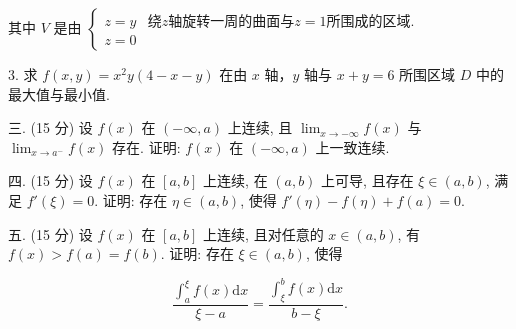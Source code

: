 \documentclass{examcollection}
\renewcommand{\displayformula}[1]{\[#1\]}
\begin{document}
{\begin{minipage}{\textwidth}
其中 $V$ 是由 $\left\{ \begin{array}{ll}z = y & \text{绕} z\text{轴旋转一周的曲面与} z = 1\text{所围成的区域}.\\ z = 0 & \end{array} \right.$\par
3. 求 $f(x, y) = x^2 y (4 - x - y)$ 在由 $x$ 轴，$y$ 轴与 $x + y = 6$ 所围区域 $D$ 中的最大值与最小值.\par
三. (15 分) 设 $f(x)$ 在 $(- \infty, a)$ 上连续, 且 $\lim_{x \to -\infty} f(x)$ 与 $\lim_{x \to a^{-}} f(x)$ 存在. 证明: $f(x)$ 在 $(- \infty, a)$ 上一致连续.\par
四. (15 分) 设 $f(x)$ 在 $[a, b]$ 上连续, 在 $(a, b)$ 上可导, 且存在 $\xi \in (a, b)$, 满足 $f'(\xi) = 0$. 证明: 存在 $\eta \in (a, b)$, 使得 $f'(\eta) - f(\eta) + f(a) = 0$.\par
五. (15 分) 设 $f(x)$ 在 $[a, b]$ 上连续, 且对任意的 $x \in (a, b)$, 有 $f(x) > f(a) = f(b)$. 证明: 存在 $\xi \in (a, b)$, 使得\par
\displayformula{\frac {\int_ {a} ^ {\xi} f (x) \mathrm{d} x}{\xi - a} = \frac {\int_ {\xi} ^ {b} f (x) \mathrm{d} x}{b - \xi}.}\par
\end{minipage}}
\ifdim\dimexpr\ht\proofbox+\dp\proofbox\relax>\textheight
\noindent\resizebox{!}{\textheight}{\usebox{\proofbox}}\else\noindent\usebox{\proofbox}\fi\clearpage
\end{document}
